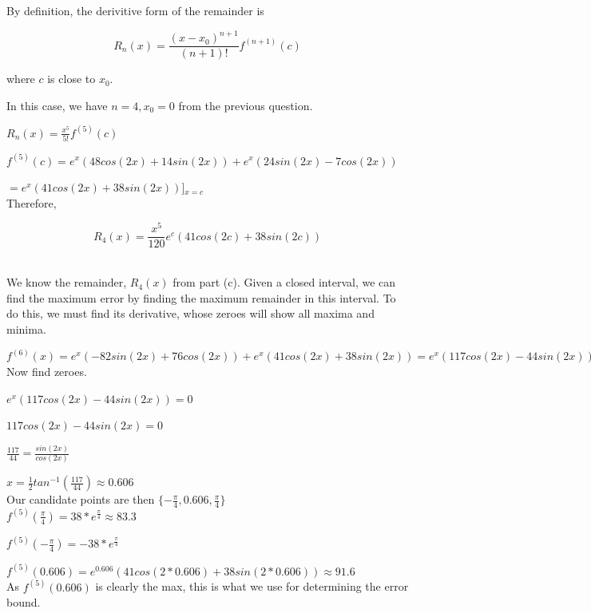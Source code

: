 \item

	By definition, the derivitive form of the remainder is

	$$R_n(x) = \frac{(x-x_0)^{n+1}}{(n+1)!} f^{(n+1)}(c)$$

	where $c$ is close to $x_0$.

	In this case, we have $n=4, x_0 = 0$ from the previous question.

	\newpage

	$R_n(x) = \frac{x^5}{5!}f^{(5)}(c)$

	$f^{(5)}(c) = e^x(48cos(2x) + 14sin(2x)) + e^x(24sin(2x) - 7cos(2x))$

	$= e^x(41cos(2x)+38sin(2x))$]$_{x=c}$ \\

	Therefore,

	$$R_4(x) = \frac{x^5}{120} e^c(41cos(2c)+38sin(2c))$$ \\

\item

	We know the remainder, $R_4(x)$ from part (c). Given a closed interval, we can find the maximum error by
	finding the maximum remainder in this interval. To do this, we must find its derivative,
	whose zeroes will show all maxima and minima.

	$f^{(6)}(x) = e^x(-82sin(2x)+76cos(2x)) + e^x(41cos(2x) + 38sin(2x)) = e^x(117cos(2x) - 44sin(2x))$ \\

	Now find zeroes.

	$e^x(117cos(2x)-44sin(2x)) = 0$

	$117cos(2x)-44sin(2x) = 0$

	$\frac{117}{44} = \frac{sin(2x)}{cos(2x)}$

	$x = \frac{1}{2} tan^{-1}(\frac{117}{44}) \approx 0.606$ \\

	Our candidate points are then $\{-\frac{\pi}{4}, 0.606, \frac{\pi}{4} \}$ \\

	$f^{(5)}(\frac{\pi}{4}) = 38*e^{\frac{\pi}{4}} \approx 83.3$

	$f^{(5)}(-\frac{\pi}{4}) = -38*e^{\frac{\pi}{4}}$

	$f^{(5)}(0.606) = e^{0.606}(41cos(2*0.606)+38sin(2*0.606)) \approx 91.6$ \\

	As $f^{(5)}(0.606)$ is clearly the max, this is what we use for determining the error bound. \\

